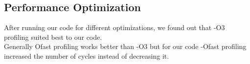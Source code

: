 \documentclass[english, 11pt]{article}
\begin{document}
\subsection{Performance Optimization}
After running our code for different optimizations, we found out that -O3 profiling suited best to our code.\\
 Generally Ofast profiling works better than -O3 but for our code -Ofast profiling increased the number of cycles instead of decreasing it.\\ 




\end{document}
